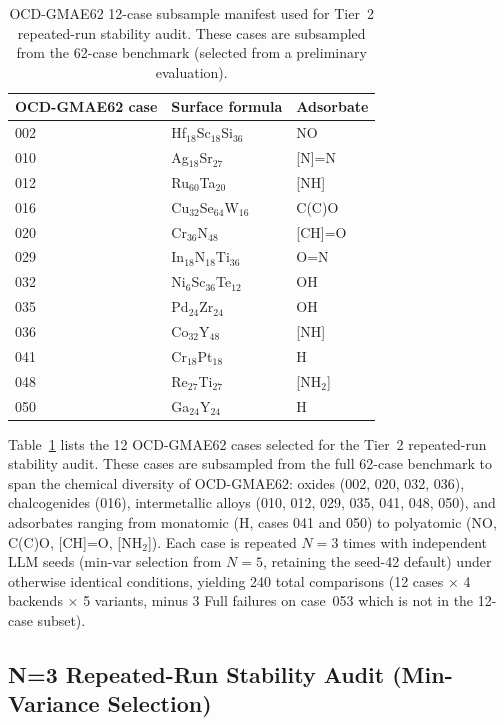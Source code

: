\documentclass[%
 preprint,
 superscriptaddress,
 amsmath,amssymb,
 aps,
 prb,
 floatfix,
]{revtex4-2}
\begin{document}
\begin{table}[ht]
\centering
\scriptsize
\caption{OCD-GMAE62 12-case subsample manifest used for Tier~2 repeated-run stability audit. These cases are subsampled from the 62-case benchmark (selected from a preliminary evaluation).}
\label{tab:si-ocd62-manifest}
\begin{tabular}{lll}
\toprule
OCD-GMAE62 case & Surface formula & Adsorbate \\
\midrule
002 & Hf$_{18}$Sc$_{18}$Si$_{36}$ & NO \\
010 & Ag$_{18}$Sr$_{27}$ & [N]=N \\
012 & Ru$_{60}$Ta$_{20}$ & [NH] \\
016 & Cu$_{32}$Se$_{64}$W$_{16}$ & C(C)O \\
020 & Cr$_{36}$N$_{48}$ & [CH]=O \\
029 & In$_{18}$N$_{18}$Ti$_{36}$ & O=N \\
032 & Ni$_6$Sc$_{36}$Te$_{12}$ & OH \\
035 & Pd$_{24}$Zr$_{24}$ & OH \\
036 & Co$_{32}$Y$_{48}$ & [NH] \\
041 & Cr$_{18}$Pt$_{18}$ & H \\
048 & Re$_{27}$Ti$_{27}$ & [NH$_2$] \\
050 & Ga$_{24}$Y$_{24}$ & H \\
\bottomrule
\end{tabular}
\end{table}

Table~\ref{tab:si-ocd62-manifest} lists the 12 OCD-GMAE62 cases selected for the Tier~2 repeated-run stability audit. These cases are subsampled from the full 62-case benchmark to span the chemical diversity of OCD-GMAE62: oxides (002, 020, 032, 036), chalcogenides (016), intermetallic alloys (010, 012, 029, 035, 041, 048, 050), and adsorbates ranging from monatomic (H, cases 041 and 050) to polyatomic (NO, C(C)O, [CH]=O, [NH$_2$]). Each case is repeated $N=3$ times with independent LLM seeds (min-var selection from $N=5$, retaining the seed-42 default) under otherwise identical conditions, yielding 240 total comparisons (12 cases $\times$ 4 backends $\times$ 5 variants, minus 3 Full failures on case~053 which is not in the 12-case subset).

\subsection{N=3 Repeated-Run Stability Audit (Min-Variance Selection)}
\end{document}

